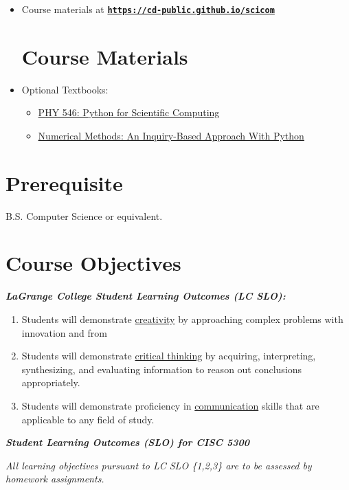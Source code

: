 \documentclass[11pt]{article}
\begin{document}
\begin{itemize}
\item Course materials at \href{https://cd-public.github.io/scicom/}{\tt\bf https://cd-public.github.io/scicom}
\section*{Course Materials}
\item Optional Textbooks: 
\begin{itemize}
\item \href{https://sbu-python-class.github.io/python-science/Introduction.html}{PHY 546: Python for Scientific Computing}
\item \href{https://numericalmethodssullivan.github.io/}{Numerical Methods: An Inquiry-Based Approach With Python }
\end{itemize}
\end{itemize}


\section*{Prerequisite}
B.S. Computer Science or equivalent.


\section*{Course Objectives}
\textbf{\textit{LaGrange College Student Learning Outcomes (LC SLO):}}

\begin{enumerate}
\item Students will demonstrate \underline{creativity} by approaching complex problems with innovation and from
\item Students will demonstrate \underline{critical thinking} by acquiring, interpreting, synthesizing, and evaluating
information to reason out conclusions appropriately.
\item Students will demonstrate proficiency in \underline{communication} skills that are applicable to any field of
study.
\end{enumerate}

\textbf{\textit{Student Learning Outcomes (SLO) for CISC 5300}}

\textit{All learning objectives pursuant to LC SLO \{1,2,3\} are to be assessed by homework assignments.}
\end{document}
